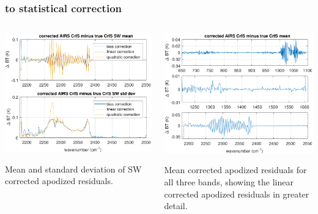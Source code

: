 \begin{frame}
\frametitle{{\airs} to {\cris} statistical correction}
\begin{columns}[t]
\begin{column}{0.5\textwidth}  
  \begin{centering}
  \includegraphics[width=\textwidth]{figures/a2cris_regr_SW.pdf}
  \end{centering}\vspace{3mm}
  Mean and standard deviation of SW corrected apodized residuals.

\end{column}
\begin{column}{0.5\textwidth}
  \begin{centering}
  \includegraphics[width=\textwidth]{figures/ap_decon_corr.pdf}
  \end{centering}\vspace{3mm}
  Mean corrected apodized residuals for all three bands, showing
  the linear corrected apodized residuals in greater detail.
\end{column}
\end{columns}
\end{frame}
